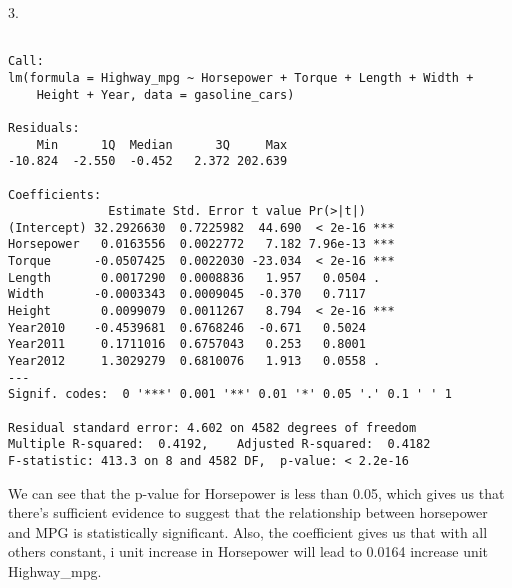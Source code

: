 \documentclass[
  letterpaper,
  DIV=11,
  numbers=noendperiod]{scrartcl}
\newenvironment{Shaded}{\begin{snugshade}}{\end{snugshade}}
\newcommand{\AttributeTok}[1]{\textcolor[rgb]{0.40,0.45,0.13}{#1}}
\newcommand{\FunctionTok}[1]{\textcolor[rgb]{0.28,0.35,0.67}{#1}}
\newcommand{\NormalTok}[1]{\textcolor[rgb]{0.00,0.23,0.31}{#1}}
\newcommand{\OtherTok}[1]{\textcolor[rgb]{0.00,0.23,0.31}{#1}}
\newcommand{\SpecialCharTok}[1]{\textcolor[rgb]{0.37,0.37,0.37}{#1}}
\begin{document}
3.

\begin{Shaded}
\end{Shaded}

\begin{verbatim}

Call:
lm(formula = Highway_mpg ~ Horsepower + Torque + Length + Width + 
    Height + Year, data = gasoline_cars)

Residuals:
    Min      1Q  Median      3Q     Max 
-10.824  -2.550  -0.452   2.372 202.639 

Coefficients:
              Estimate Std. Error t value Pr(>|t|)    
(Intercept) 32.2926630  0.7225982  44.690  < 2e-16 ***
Horsepower   0.0163556  0.0022772   7.182 7.96e-13 ***
Torque      -0.0507425  0.0022030 -23.034  < 2e-16 ***
Length       0.0017290  0.0008836   1.957   0.0504 .  
Width       -0.0003343  0.0009045  -0.370   0.7117    
Height       0.0099079  0.0011267   8.794  < 2e-16 ***
Year2010    -0.4539681  0.6768246  -0.671   0.5024    
Year2011     0.1711016  0.6757043   0.253   0.8001    
Year2012     1.3029279  0.6810076   1.913   0.0558 .  
---
Signif. codes:  0 '***' 0.001 '**' 0.01 '*' 0.05 '.' 0.1 ' ' 1

Residual standard error: 4.602 on 4582 degrees of freedom
Multiple R-squared:  0.4192,    Adjusted R-squared:  0.4182 
F-statistic: 413.3 on 8 and 4582 DF,  p-value: < 2.2e-16
\end{verbatim}

We can see that the p-value for Horsepower is less than 0.05, which
gives us that there's sufficient evidence to suggest that the
relationship between horsepower and MPG is statistically significant.
Also, the coefficient gives us that with all others constant, i unit
increase in Horsepower will lead to 0.0164 increase unit Highway\_mpg.
\end{document}
